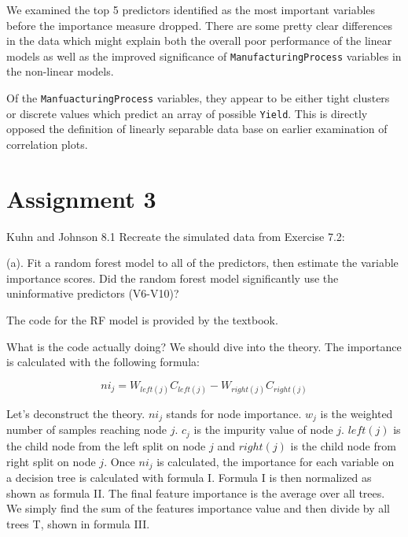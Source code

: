 \documentclass[]{report}
\begin{document}
We examined the top 5 predictors identified as the most important
variables before the importance measure dropped. There are some pretty
clear differences in the data which might explain both the overall poor
performance of the linear models as well as the improved significance of
\texttt{ManufacturingProcess} variables in the non-linear models.

Of the \texttt{ManfuacturingProcess} variables, they appear to be either
tight clusters or discrete values which predict an array of possible
\texttt{Yield}. This is directly opposed the definition of linearly
separable data base on earlier examination of correlation plots.

\chapter*{Assignment 3}\label{AS-3}


\begin{question}{Kuhn and Johnson 8.1} Recreate the simulated data from Exercise 7.2: \end{question}

\begin{subquestion}{(a).} Fit a random forest model to all of the predictors, then estimate the variable importance scores. Did the random forest model significantly use the uninformative predictors (V6-V10)?\end{subquestion}

The code for the RF model is provided by the textbook.

What is the code actually doing? We should dive into the theory. The
importance is calculated with the following formula:

\[
ni_j=W_{left(j)}C_{left(j)}-W_{right(j)}C_{right(j)}
\]

Let's deconstruct the theory. \(ni_j\) stands for node importance.
\(w_j\) is the weighted number of samples reaching node \(j\). \(c_j\)
is the impurity value of node \(j\). \(left(j)\) is the child node from
the left split on node \(j\) and \(right(j)\) is the child node from
right split on node \(j\). Once \(ni_j\) is calculated, the importance
for each variable on a decision tree is calculated with formula I.
Formula I is then normalized as shown as formula II. The final feature
importance is the average over all trees. We simply find the sum of the
features importance value and then divide by all trees T, shown in
formula III.
\end{document}
